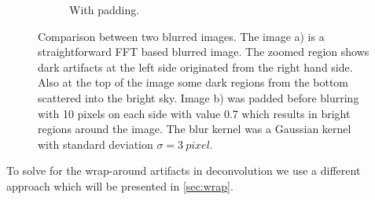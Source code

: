\documentclass{juliacon}
\begin{document}
\begin{figure}[h]
        \begin{subfigure}[b]{.25\textwidth}
            \centering
            \caption{With padding.}
            \label{fig:withpad}
        \end{subfigure}
        \caption{Comparison between two blurred images. The image a) is a straightforward FFT based blurred image.
        The zoomed region shows dark artifacts at the left side originated from the right hand side. Also at the top of the image some dark regions from
        the bottom scattered into the bright sky.
        Image b) was padded before blurring with 10 pixels on each side with value 0.7 which results in bright regions around the image. The blur kernel was a Gaussian kernel
        with standard deviation $\sigma=\SI{3}{pixel}$.}
        \label{fig:}
    \end{figure}
    To solve for the wrap-around artifacts in deconvolution we use a different approach which will be presented in \autoref{sec:wrap}. 
\end{document}
